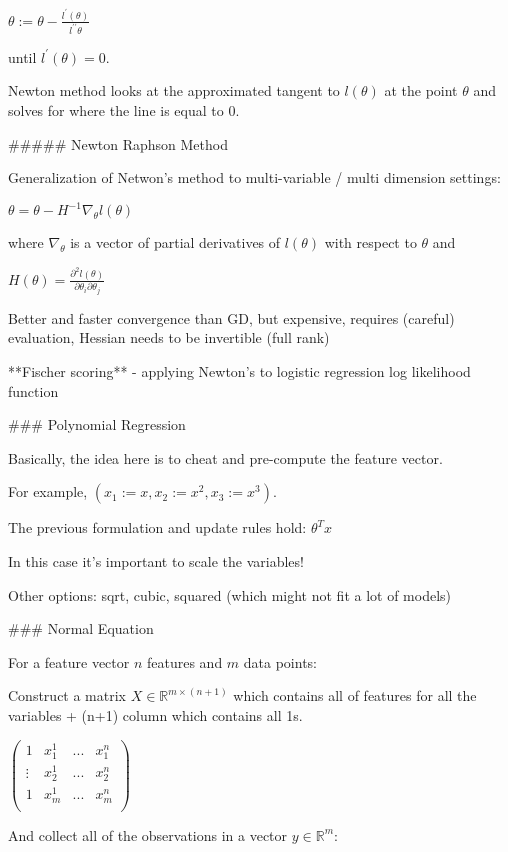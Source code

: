 $\theta := \theta - \frac{l^\prime(\theta)}{l^{\prime\prime}\theta}$

until $l^\prime(\theta)=0$. 

Newton method looks at the approximated tangent to $l(\theta)$ at the point $\theta$ and solves for where the line is equal to 0.

##### Newton Raphson Method

Generalization of Netwon's method to multi-variable / multi dimension settings:

$\theta = \theta - H^{-1}\nabla_\theta l(\theta)$

where $\nabla_\theta$ is a vector of partial derivatives of $l(\theta)$ with respect to $\theta$ and 

$H(\theta)=\frac{\partial^2 l(\theta)}{\partial \theta_i\partial\theta_j}$

Better and faster convergence than GD, but expensive, requires (careful) evaluation, Hessian needs to be invertible (full rank)

**Fischer scoring** - applying Newton's to logistic regression log likelihood function

###  Polynomial Regression

Basically, the idea here is to cheat and pre-compute the feature vector. 

For example, $(x_1 := x, x_2 := x^2, x_3 := x^3)$. 

The previous formulation and update rules hold: $\theta^Tx$

In this case it's important to scale the variables!

Other options: sqrt, cubic, squared (which might not fit a lot of models)

### Normal Equation

For a feature vector $n$ features and $m$ data points: 

Construct a matrix $X  \in \mathbb{R}^{m\times (n+1)}$ which contains all of features for all the variables + (n+1) column which contains all 1s.

$\left( \begin{matrix} 1 & x_1^1 & ... & x_1^n \\ \vdots & x_2^1 & ... & x_2^n \\   1 & x_m^1 & ... & x_m^n \\ \end{matrix} \right)$

And collect all of the observations in a vector $y \in \mathbb{R}^m $:

